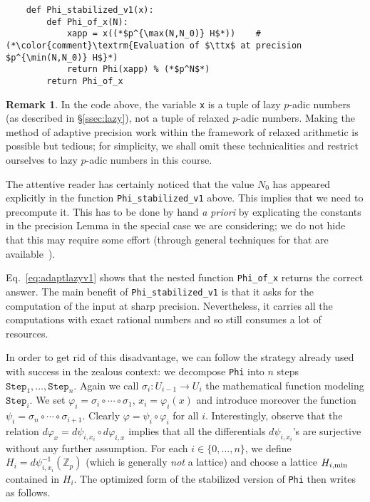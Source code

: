 \documentclass[11pt]{article}
\numberwithin{equation}{section}
\numberwithin{figure}{section}
\theoremstyle{definition}
\newtheorem{rem}[theo]{Remark}
\newcommand{\Z}{\mathbb Z}
\newcommand{\Zp}{\Z_p}
\renewcommand{\min}{\text{\rm min}}
\renewcommand{\max}{\text{\rm max}}
\newcommand{\ttx}{\texttt{\rm x}\xspace}
\begin{document}
\begin{lstlisting}
    def Phi_stabilized_v1(x):
        def Phi_of_x(N):
            xapp = x((*$p^{\max(N,N_0)} H$*))    # (*\color{comment}\textrm{Evaluation of $\ttx$ at precision $p^{\min(N,N_0)} H$}*)
            return Phi(xapp) % (*$p^N$*)
        return Phi_of_x
\end{lstlisting}

\begin{rem}
In the code above, the variable \texttt{x} is a tuple of lazy $p$-adic 
numbers (as described in \S \ref{ssec:lazy}), not a tuple of relaxed 
$p$-adic numbers. Making the method of adaptive precision work within 
the framework of relaxed arithmetic is possible but tedious; for 
simplicity, we shall omit these technicalities and restrict 
ourselves to lazy $p$-adic numbers in this course.

The attentive reader has certainly noticed that the value $N_0$ has 
appeared explicitly in the function \texttt{Phi\_stabilized\_v1} above. 
This implies that we need to precompute it. This has to be done by hand 
\emph{a priori} by explicating the constants in the precision Lemma in 
the special case we are considering; we do not hide that this may 
require some effort (through general techniques for that are 
available~\cite{CaRoVa14,CaRoVa15}).
\end{rem}

Eq.~\eqref{eq:adaptlazyv1} shows that the nested function 
\texttt{Phi\_of\_x} returns the correct answer.
The main benefit of \texttt{Phi\_stabilized\_v1} is that it asks for the 
computation of the input at sharp precision. Nevertheless, it carries 
all the computations with exact rational numbers and so still consumes 
a lot of resources.

In order to get rid of this disadvantage, we can follow the strategy 
already used with success in the zealous context: we decompose 
\texttt{Phi} into $n$ steps $\texttt{Step}_1, \ldots, \texttt{Step}_n$. 
Again we call $\sigma_i : U_{i-1} \to U_i$ the mathematical function 
modeling $\texttt{Step}_i$. We set $\varphi_i = \sigma_i \circ \cdots 
\circ \sigma_1$, $x_i = \varphi_i(x)$ and introduce moreover the 
function $\psi_i = \sigma_n \circ \cdots \circ \sigma_{i+1}$. Clearly 
$\varphi = \psi_i \circ \varphi_i$ for all $i$. Interestingly, observe 
that the relation $d \varphi_x = d \psi_{i,x_i} \circ d \varphi_{i,x}$ 
implies that all the differentials $d \psi_{i,x_i}$'s are surjective 
without any further assumption. For each $i \in \{0,\ldots, n\}$, we 
define $H_i = d \psi_{i,x_i}^{-1} (\Zp)$ (which is generally \emph{not} 
a lattice) and choose a lattice $H_{i,\min}$ contained in $H_i$. The 
optimized form of the stabilized version of \texttt{Phi} then writes as 
follows.
\end{document}
